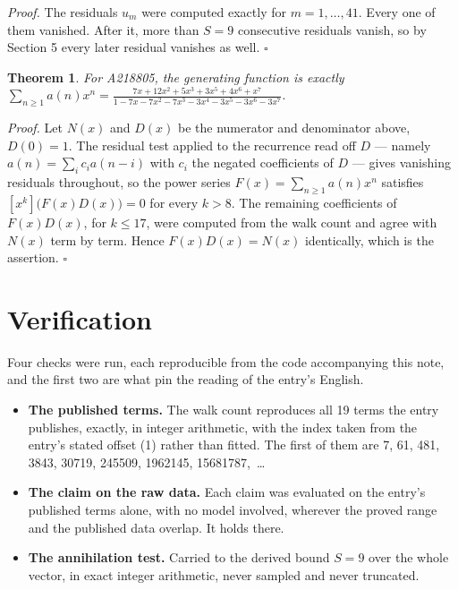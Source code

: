 \documentclass[11pt]{article}
\newtheorem{theorem}{Theorem}
\theoremstyle{definition}
\begin{document}
{\itshape Proof.} The residuals $u_m$ were computed exactly for $m = 1,\dots,41$. Every one of them vanished. After it, more than $S = 9$ consecutive residuals vanish, so by Section 5 every later residual vanishes as well. $\square$

\begin{theorem} For A218805, the generating function is exactly $\sum_{n\ge 1} a(n)x^n = \frac{7x + 12x^{2} + 5x^{3} + 3x^{5} + 4x^{6} + x^{7}}{1 - 7x - 7x^{2} - 7x^{3} - 3x^{4} - 3x^{5} - 3x^{6} - 3x^{7}}$.\end{theorem}

{\itshape Proof.} Let $N(x)$ and $D(x)$ be the numerator and denominator above, $D(0)=1$. The residual test applied to the recurrence read off $D$ --- namely $a(n) = \sum_i c_i a(n-i)$ with $c_i$ the negated coefficients of $D$ --- gives vanishing residuals throughout, so the power series $F(x)=\sum_{n\ge 1}a(n)x^n$ satisfies $[x^k]\bigl(F(x)D(x)\bigr) = 0$ for every $k > 8$. The remaining coefficients of $F(x)D(x)$, for $k \le 17$, were computed from the walk count and agree with $N(x)$ term by term. Hence $F(x)D(x) = N(x)$ identically, which is the assertion. $\square$

\section{Verification}

Four checks were run, each reproducible from the code accompanying this note, and the first two are what pin the reading of the entry's English.

\begin{itemize}

\item {\bfseries The published terms.} The walk count reproduces all 19 terms the entry publishes, exactly, in integer arithmetic, with the index taken from the entry's stated offset (1) rather than fitted. The first of them are 7, 61, 481, 3843, 30719, 245509, 1962145, 15681787,~\dots

\item {\bfseries The claim on the raw data.} Each claim was evaluated on the entry's published terms alone, with no model involved, wherever the proved range and the published data overlap. It holds there.

\item {\bfseries The annihilation test.} Carried to the derived bound $S = 9$ over the whole vector, in exact integer arithmetic, never sampled and never truncated.

\end{itemize}
\end{document}
